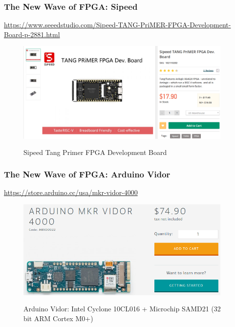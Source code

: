 \documentclass{beamer}
\begin{document}
\begin{frame}
\frametitle{The New Wave of FPGA: Sipeed}

\begin{tiny}
\url{https://www.seeedstudio.com/Sipeed-TANG-PriMER-FPGA-Development-Board-p-2881.html}
\end{tiny}

\begin{figure}[h]
	\centering
	\includegraphics[width=0.95\textwidth]{graphics/sispeed_tang_fpga.png}
	\centering\bfseries
	\caption{Sipeed Tang Primer FPGA Development Board}
\end{figure}

\end{frame}

\begin{frame}
\frametitle{The New Wave of FPGA: Arduino Vidor}

\url{https://store.arduino.cc/usa/mkr-vidor-4000}

\begin{figure}[h]
	\centering
	\includegraphics[width=0.95\textwidth]{graphics/arduino_vidor.png}
	\centering\bfseries
	\caption{Arduino Vidor:  Intel Cyclone 10CL016 + Microchip SAMD21 (32 bit ARM Cortex M0+)}
\end{figure}


\end{frame}
\end{document}
